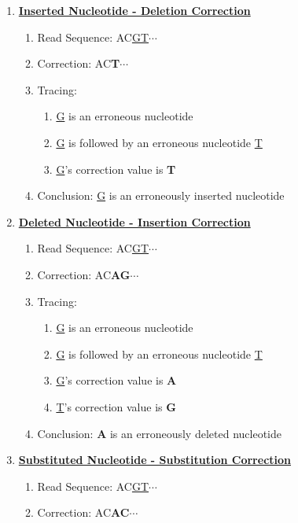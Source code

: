 \documentclass[12pt,openany]{llncs}
\begin{document}
\begin{figure}
\vspace{0cm}
\begin{bordered}
\begin{enumerate}
	\item  \textbf{\underline{Inserted Nucleotide - Deletion Correction}}
	\begin{enumerate}
		\item Read Sequence: AC\underline{GT}$\cdots$
		\item Correction: AC\textbf{T}$\cdots$
		\item Tracing: 
		\begin{enumerate}
			\item \underline{G} is an erroneous nucleotide
			\item \underline{G} is followed by an erroneous nucleotide \underline{T}
			\item \underline{G}'s correction value is \textbf{T}
		\end{enumerate}
		\item Conclusion: \underline{G} is an erroneously inserted nucleotide
	\end{enumerate}
	\item  \textbf{\underline{Deleted Nucleotide - Insertion Correction}}
	\begin{enumerate}
		\item Read Sequence: AC\underline{GT}$\cdots$
		\item Correction: AC\textbf{AG}$\cdots$
		\item Tracing: 
		\begin{enumerate}
			\item \underline{G} is an erroneous nucleotide
			\item \underline{G} is followed by an erroneous nucleotide \underline{T}
			\item \underline{G}'s correction value is \textbf{A}
			\item \underline{T}'s correction value is \textbf{G}
		\end{enumerate}
		\item Conclusion: \textbf{A} is an erroneously deleted nucleotide	
	\end{enumerate}
	\item  \textbf{\underline{Substituted Nucleotide - Substitution Correction}}
	\begin{enumerate}
		\item Read Sequence: AC\underline{GT}$\cdots$
		\item Correction: AC\textbf{AC}$\cdots$

\end{enumerate}
\end{enumerate}
\end{bordered}
\end{figure}
\end{document}
